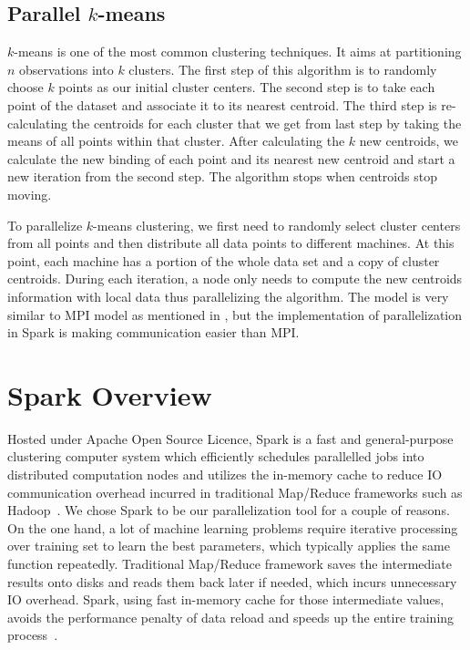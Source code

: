 \documentclass{acm_proc_article-sp}
\begin{document}
\subsection{Parallel $k$-means}
$k$-means is one of the most common clustering techniques. It aims at partitioning $n$ observations into $k$ clusters. The first step of this algorithm is to randomly choose $k$ points as our initial cluster centers. The second step is to take each point of the dataset and associate it to its nearest centroid. The third step is re-calculating the centroids for each cluster that we get from last step by taking the means of all points within that cluster. After calculating the $k$ new centroids, we calculate the new binding of each point and its nearest new centroid and start a new iteration from the second step. The algorithm stops when centroids stop moving.

To parallelize $k$-means clustering, we first need to randomly select cluster centers from all points and then distribute all data points to different machines. At this point, each machine has a portion of the whole data set and a copy of cluster centroids. During each iteration, a node only needs to compute the new centroids information with local data thus parallelizing the algorithm. The model is very similar to MPI model as mentioned in \cite{chen2011parallel}, but the implementation of parallelization in Spark is making communication easier than MPI.


\section{Spark Overview}
Hosted under Apache Open Source Licence, Spark is a fast and general-purpose clustering computer system which efficiently schedules parallelled jobs into distributed computation nodes and utilizes the in-memory cache to reduce IO communication overhead incurred in traditional Map/Reduce frameworks such as Hadoop~\cite{zaharia2010spark}. We chose Spark to be our parallelization tool for a couple of reasons. On the one hand, a lot of machine learning problems require iterative processing over training set to learn the best parameters, which typically applies the same function repeatedly. Traditional Map/Reduce framework saves the intermediate results onto disks and reads them back later if needed, which incurs unnecessary IO overhead. Spark, using fast in-memory cache for those intermediate values, avoids the performance penalty of data reload and speeds up the entire training process~\cite{zaharia2010spark}.
\end{document}
